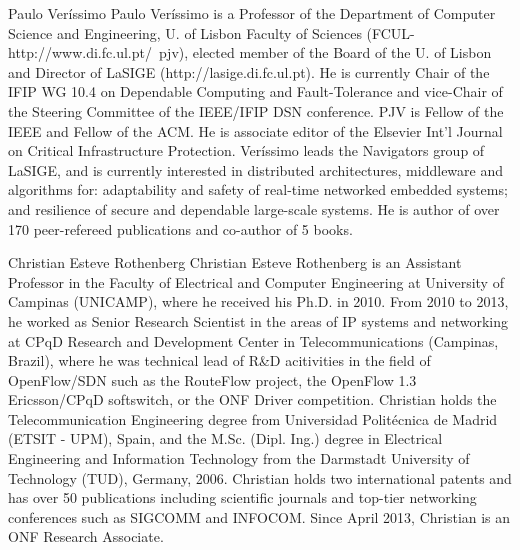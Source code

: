\documentclass[journal]{IEEEtran}
\begin{document}
\begin{IEEEbiographynophoto}{Paulo Ver\'{i}ssimo}
Paulo Ver\'{i}ssimo is a Professor of the Department of Computer Science and Engineering, U. of Lisbon Faculty of Sciences (FCUL-http://www.di.fc.ul.pt/~pjv), elected member of the Board of the U. of Lisbon and Director of LaSIGE (http://lasige.di.fc.ul.pt). He is currently Chair of the IFIP WG 10.4 on Dependable Computing and Fault-Tolerance and vice-Chair of the Steering Committee of the IEEE/IFIP DSN conference. PJV is Fellow of the IEEE and Fellow of the ACM. He is associate editor of the Elsevier Int'l Journal on Critical Infrastructure Protection. Ver\'{i}ssimo leads the Navigators group of LaSIGE, and is currently interested in distributed architectures, middleware and algorithms for: adaptability and safety of real-time networked embedded systems; and resilience of secure and dependable large-scale systems. He is author of over 170 peer-refereed publications and co-author of 5 books. 
\end{IEEEbiographynophoto}

\begin{IEEEbiographynophoto}{Christian Esteve Rothenberg}
Christian Esteve Rothenberg is an Assistant Professor in the Faculty of Electrical and Computer Engineering at University of Campinas (UNICAMP), where he received his Ph.D. in 2010. 
From 2010 to 2013, he worked as Senior Research Scientist in the areas of IP systems and networking at CPqD Research and Development Center in Telecommunications (Campinas, Brazil), where he was technical lead of R\&D acitivities in the field of OpenFlow/SDN such as the RouteFlow project, the OpenFlow 1.3 Ericsson/CPqD softswitch, or the ONF Driver competition. 
Christian holds the Telecommunication Engineering degree from Universidad Polit\'{e}cnica de Madrid (ETSIT - UPM), Spain, and the M.Sc. (Dipl. Ing.) degree in Electrical Engineering and Information Technology from the Darmstadt University of Technology (TUD), Germany, 2006. Christian holds two international patents and has over 50 publications including scientific journals and top-tier networking conferences such as SIGCOMM and INFOCOM. Since April 2013, Christian is an ONF Research Associate.
\end{IEEEbiographynophoto}
\end{document}
